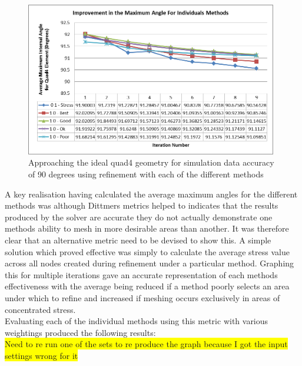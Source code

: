 \begin{figure}[H]
  \centerline{\includegraphics[width=110mm, scale=1]{../Graphics/Graphs/SingleMethods/AngleImprovements.png}}
  \caption{Approaching the ideal quad4 geometry for simulation data accuracy of 90 degrees using refinement with each of the different methods}
  \label{fig:sub1}
\end{figure}  

\noindent
A key realisation having calculated the average maximum angles for the different methods was although Dittmers metrics helped to indicates that the results produced by the solver are accurate they do not actually demonstrate one methods ability to mesh in more desirable areas than another. It was therefore clear that an alternative metric need to be devised to show this. A simple solution which proved effective was simply to calculate the average stress value across all nodes created during refinement under a particular method. Graphing this for multiple iterations gave an accurate representation of each methods effectiveness with the average being reduced if a method poorly selects an area under which to refine and increased if meshing occurs exclusively in areas of concentrated stress. \\

\noindent
Evaluating each of the individual methods using this metric with various weightings produced the following results: \\ 

\colorbox{yellow}{Need to re run one of the sets to re produce the graph because I got the input settings wrong for it} \\ 

